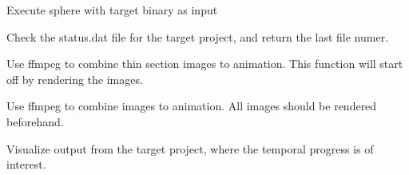 \documentclass[letterpaper,10pt,english]{sphinxmanual}
\begin{document}

\begin{fulllineitems}
\label{python_api:sphere.run}
Execute sphere with target binary as input

\end{fulllineitems}


\begin{fulllineitems}
\label{python_api:sphere.status}
Check the status.dat file for the target project,
and return the last file numer.

\end{fulllineitems}


\begin{fulllineitems}
\label{python_api:sphere.thinsectionVideo}
Use ffmpeg to combine thin section images to animation.
This function will start off by rendering the images.

\end{fulllineitems}


\begin{fulllineitems}
\label{python_api:sphere.video}
Use ffmpeg to combine images to animation. All images should be rendered beforehand.

\end{fulllineitems}


\begin{fulllineitems}
\label{python_api:sphere.visualize}
Visualize output from the target project,
where the temporal progress is of interest.

\end{fulllineitems}
\end{document}
